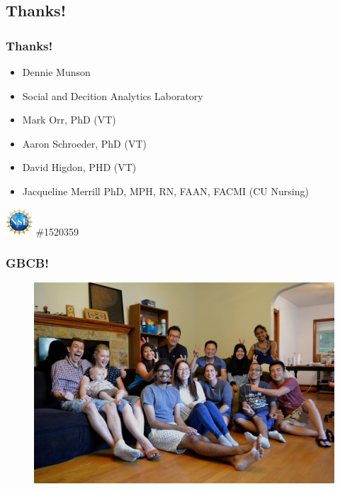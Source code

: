 \documentclass[compress]{beamer}
\begin{document}
\subsection{Thanks!}

    \begin{frame}[Basic2] \frametitle{Thanks!}
        \begin{itemize}
            \item Dennie Munson 
            \item Social and Decition Analytics Laboratory
        \end{itemize}

        \begin{itemize}
            \item Mark Orr, PhD (VT)
            \item Aaron Schroeder, PhD (VT)
            \item David Higdon, PHD (VT)
            \item Jacqueline Merrill PhD, MPH, RN, FAAN, FACMI (CU Nursing)
        \end{itemize}

        \includegraphics[width=10mm]{../figures/nsf} \#1520359

    \end{frame}
    
        \begin{frame}[Basic2]\frametitle{GBCB!}
            \vspace{7mm}
            
            \begin{figure}
                \centering
                \includegraphics[width=0.7\linewidth]{../figures/gbcb}
                \caption{}
                \label{fig:gbcb}
            \end{figure}
            
        \end{frame}
    
\end{document}
